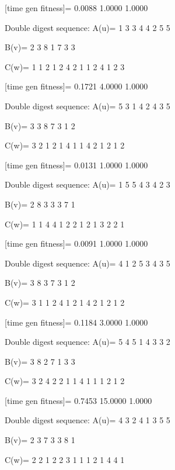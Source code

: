 [time gen fitness]=
    0.0088    1.0000    1.0000

Double digest sequence:
A(u)=
     1     3     3     4     4     2     5     5

B(v)=
     2     3     8     1     7     3     3

C(w)=
     1     1     2     1     2     4     2     1     1     2     4     1     2     3

[time gen fitness]=
    0.1721    4.0000    1.0000

Double digest sequence:
A(u)=
     5     3     1     4     2     4     3     5

B(v)=
     3     3     8     7     3     1     2

C(w)=
     3     2     1     2     1     4     1     1     4     2     1     2     1     2

[time gen fitness]=
    0.0131    1.0000    1.0000

Double digest sequence:
A(u)=
     1     5     5     4     3     4     2     3

B(v)=
     2     8     3     3     3     7     1

C(w)=
     1     1     4     4     1     2     2     1     2     1     3     2     2     1

[time gen fitness]=
    0.0091    1.0000    1.0000

Double digest sequence:
A(u)=
     4     1     2     5     3     4     3     5

B(v)=
     3     8     3     7     3     1     2

C(w)=
     3     1     1     2     4     1     2     1     4     2     1     2     1     2

[time gen fitness]=
    0.1184    3.0000    1.0000

Double digest sequence:
A(u)=
     5     4     5     1     4     3     3     2

B(v)=
     3     8     2     7     1     3     3

C(w)=
     3     2     4     2     2     1     1     4     1     1     1     2     1     2

[time gen fitness]=
    0.7453   15.0000    1.0000

Double digest sequence:
A(u)=
     4     3     2     4     1     3     5     5

B(v)=
     2     3     7     3     3     8     1

C(w)=
     2     2     1     2     2     3     1     1     1     2     1     4     4     1

